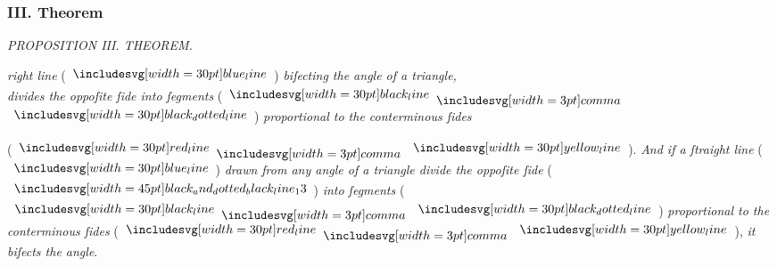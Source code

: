 \documentclass[12pt,preview]{standalone}
\begin{document}
\subsubsection{III. Theorem}

\begin{minipage}[t]{0.33\textwidth}
    \vspace{40pt}
    
\end{minipage}%
\hfill
\begin{minipage}[t]{0.64\textwidth}
    \vspace{0pt}

    \begin{center}
        \textit{PROPOSITION III. THEOREM.}\label{book6pr3} \\
    \end{center}

    \hfill

    \begin{center}
        \raggedright \lettrine[lines=4, loversize=1, nindent=0pt]{}{} \textit{right line} (\hspace{-1ex}$\blueline$\hspace{-1ex}) \textit{biſecting the angle of a triangle,\\ divides the oppoſite ſide into ſegments} (\hspace{-1ex}$\blackline \bcomma$\\ $\dottedblackline$\hspace{-1ex}) \textit{proportional to the conterminous ſides}
    \end{center}
    \raggedright (\hspace{-1ex}$\redline \bcomma \yellowline$\hspace{-1ex}). \textit{And if a ſtraight line} (\hspace{-1ex}$\blueline$\hspace{-1ex}) \textit{drawn from any angle of a triangle divide the oppoſite ſide} (\hspace{-1ex}$\bimg{black_and_dotted_black_line_13}$\hspace{-1ex}) \textit{into ſegments} (\hspace{-1ex}$\blackline \bcomma \dottedblackline$\hspace{-1ex}) \textit{proportional to the conterminous ſides} (\hspace{-1ex}$\redline \bcomma \yellowline$\hspace{-1ex}), \textit{it biſects the angle}.


\end{minipage}
\end{document}
